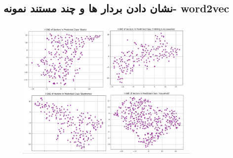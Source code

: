 \documentclass[a4paper,12pt]{article}
\begin{document}
\subsection*{نشان دادن بردار ها و چند مستند نمونه- word2vec}
\begin{figure}[H]
    \centering
    \includegraphics[width=0.8\textwidth]{vectorsWord2vec.png}
    \label{fig:yourlabel}
\end{figure}
\end{document}
